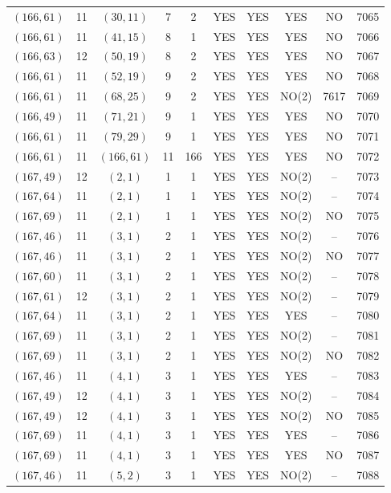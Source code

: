 \begin{longtable}{|c|c|c|c|c|c|c|c|c|c|}
$(166, 61)$ & 11 & $(30, 11)$ & 7 & 2 & YES & YES & YES & NO & 7065\\
$(166, 61)$ & 11 & $(41, 15)$ & 8 & 1 & YES & YES & YES & NO & 7066\\
$(166, 63)$ & 12 & $(50, 19)$ & 8 & 2 & YES & YES & YES & NO & 7067\\
$(166, 61)$ & 11 & $(52, 19)$ & 9 & 2 & YES & YES & YES & NO & 7068\\
$(166, 61)$ & 11 & $(68, 25)$ & 9 & 2 & YES & YES & NO(2) & 7617 & 7069\\
$(166, 49)$ & 11 & $(71, 21)$ & 9 & 1 & YES & YES & YES & NO & 7070\\
$(166, 61)$ & 11 & $(79, 29)$ & 9 & 1 & YES & YES & YES & NO & 7071\\
$(166, 61)$ & 11 & $(166, 61)$ & 11 & 166 & YES & YES & YES & NO & 7072\\
$(167, 49)$ & 12 & $(2, 1)$ & 1 & 1 & YES & YES & NO(2) & -- & 7073\\
$(167, 64)$ & 11 & $(2, 1)$ & 1 & 1 & YES & YES & NO(2) & -- & 7074\\
$(167, 69)$ & 11 & $(2, 1)$ & 1 & 1 & YES & YES & NO(2) & NO & 7075\\
$(167, 46)$ & 11 & $(3, 1)$ & 2 & 1 & YES & YES & NO(2) & -- & 7076\\
$(167, 46)$ & 11 & $(3, 1)$ & 2 & 1 & YES & YES & NO(2) & NO & 7077\\
$(167, 60)$ & 11 & $(3, 1)$ & 2 & 1 & YES & YES & NO(2) & -- & 7078\\
$(167, 61)$ & 12 & $(3, 1)$ & 2 & 1 & YES & YES & NO(2) & -- & 7079\\
$(167, 64)$ & 11 & $(3, 1)$ & 2 & 1 & YES & YES & YES & -- & 7080\\
$(167, 69)$ & 11 & $(3, 1)$ & 2 & 1 & YES & YES & NO(2) & -- & 7081\\
$(167, 69)$ & 11 & $(3, 1)$ & 2 & 1 & YES & YES & NO(2) & NO & 7082\\
$(167, 46)$ & 11 & $(4, 1)$ & 3 & 1 & YES & YES & YES & -- & 7083\\
$(167, 49)$ & 12 & $(4, 1)$ & 3 & 1 & YES & YES & NO(2) & -- & 7084\\
$(167, 49)$ & 12 & $(4, 1)$ & 3 & 1 & YES & YES & NO(2) & NO & 7085\\
$(167, 69)$ & 11 & $(4, 1)$ & 3 & 1 & YES & YES & YES & -- & 7086\\
$(167, 69)$ & 11 & $(4, 1)$ & 3 & 1 & YES & YES & YES & NO & 7087\\
$(167, 46)$ & 11 & $(5, 2)$ & 3 & 1 & YES & YES & NO(2) & -- & 7088\\

\end{longtable}
